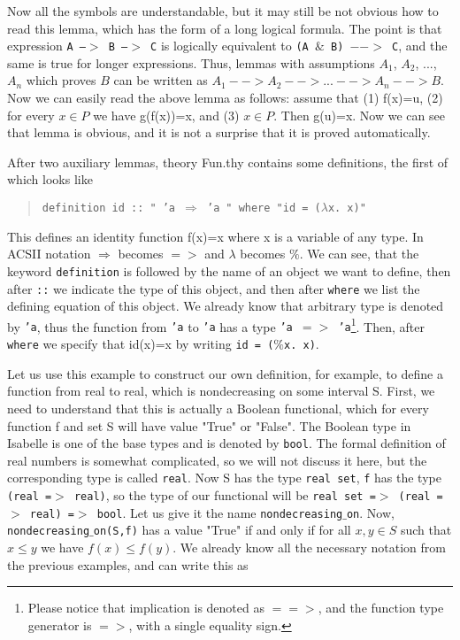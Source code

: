 \documentclass[11pt]{article}
\newcommand{\prog}[1]{\par\noindent\begin{quote}#1\end{quote}\par\noindent}
\begin{document}
Now all the symbols are understandable, but it may still be not obvious how to read this lemma, which has the form of a long logical formula. The point is that expression {\tt A --$>$ B --$>$ C} is logically equivalent to {\tt (A $\&$ B) $-->$ C}, and the same is true for longer expressions. Thus, lemmas with assumptions $A_1$, $A_2$, ..., $A_n$ which proves $B$ can be written as {\tt $A_1 --> A_2 --> ... --> A_n --> B$}. Now we can easily read the above lemma as follows: assume that (1) f(x)=u, (2) for every $x\in P$ we have g(f(x))=x, and (3) $x\in P$. Then g(u)=x. Now we can see that lemma is obvious, and it is not a surprise that it is proved automatically.

After two auxiliary lemmas, theory Fun.thy contains some definitions, the first of which looks like

\prog{\tt definition id :: "$\,\,\,$'a $\Rightarrow$ 'a$\,\,\,$" where "id = ($\lambda$x.~x)"}%

This defines an identity function f(x)=x where x is a variable of any type. In ACSII notation {\tt $\Rightarrow$} becomes {\tt $=>$} and {\tt $\lambda$} becomes {\tt $\%$}. We can see, that the keyword {\tt definition} is followed by the name of an object we want to define, then after {\tt ::} we indicate the type of this object, and then after {\tt where} we list the defining equation of this object. We already know that arbitrary type is denoted by {\tt 'a}, thus the function from {\tt 'a} to {\tt 'a} has a type {\tt 'a $=>$ 'a}\footnote{Please notice that implication is denoted as $==>$, and the function type generator is $=>$, with a single equality sign.}. Then, after {\tt where} we specify that id(x)=x by writing {\tt id = ($\%$x.~x)}.

Let us use this example to construct our own definition, for example, to define a function from real to real, which is nondecreasing on some interval S. First, we need to understand that this is actually a Boolean functional, which for every function f and set S will have value "True" or "False". The Boolean type in Isabelle is one of the base types and is denoted by {\tt bool}. The formal definition of real numbers is somewhat complicated, so we will not discuss it here, but the corresponding type is called {\tt real}. Now S has the type {\tt real set}, {\tt f} has the type {\tt (real =$>$ real)}, so the type of our functional will be {\tt real set =$>$ (real =$>$ real) =$>$ bool}. Let us give it the name {\tt nondecreasing$\_$on}. Now, {\tt nondecreasing$\_$on(S,f)} has a value "True" if and only if for all $x,y\in S$ such that $x\leq y$ we have $f(x)\leq f(y)$. We already know all the necessary notation from the previous examples, and can write this as
\end{document}
